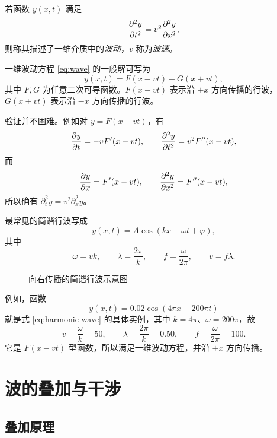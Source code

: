 \begin{definition}
若函数 $y(x,t)$ 满足
\[
\pdv[2]{y}{t}=v^2\pdv[2]{y}{x},
\]
则称其描述了一维介质中的\emph{波动}，$v$ 称为\emph{波速}。
\end{definition}

\begin{theorem}
一维波动方程 \eqref{eq:wave} 的一般解可写为
\begin{equation}
 y(x,t)=F(x-vt)+G(x+vt),
\label{eq:dalembert}
\end{equation}
其中 $F,G$ 为任意二次可导函数。$F(x-vt)$ 表示沿 $+x$ 方向传播的行波，$G(x+vt)$ 表示沿 $-x$ 方向传播的行波。
\end{theorem}

验证并不困难。例如对 $y=F(x-vt)$，有
\[
\pdv{y}{t}=-vF'(x-vt),
\qquad
\pdv[2]{y}{t}=v^2F''(x-vt),
\]
而
\[
\pdv{y}{x}=F'(x-vt),
\qquad
\pdv[2]{y}{x}=F''(x-vt),
\]
所以确有 $\partial_t^2 y=v^2\partial_x^2 y$。

最常见的简谐行波写成
\begin{equation}
 y(x,t)=A\cos(kx-\omega t+\varphi),
\label{eq:harmonic-wave}
\end{equation}
其中
\[
\omega=vk,
\qquad
\lambda=\frac{2\pi}{k},
\qquad
f=\frac{\omega}{2\pi},
\qquad
v=f\lambda.
\]

\begin{figure}[H]
\centering
{}
\caption{向右传播的简谐行波示意图}
\end{figure}

例如，函数
\[
y(x,t)=0.02\cos(4\pi x-200\pi t)
\]
就是式 \eqref{eq:harmonic-wave} 的具体实例，其中 $k=4\pi$、$\omega=200\pi$，故
\[
v=\frac{\omega}{k}=50,
\qquad
\lambda=\frac{2\pi}{k}=0.50,
\qquad
f=\frac{\omega}{2\pi}=100.
\]
它是 $F(x-vt)$ 型函数，所以满足一维波动方程，并沿 $+x$ 方向传播。

\section{波的叠加与干涉}

\subsection{叠加原理}

